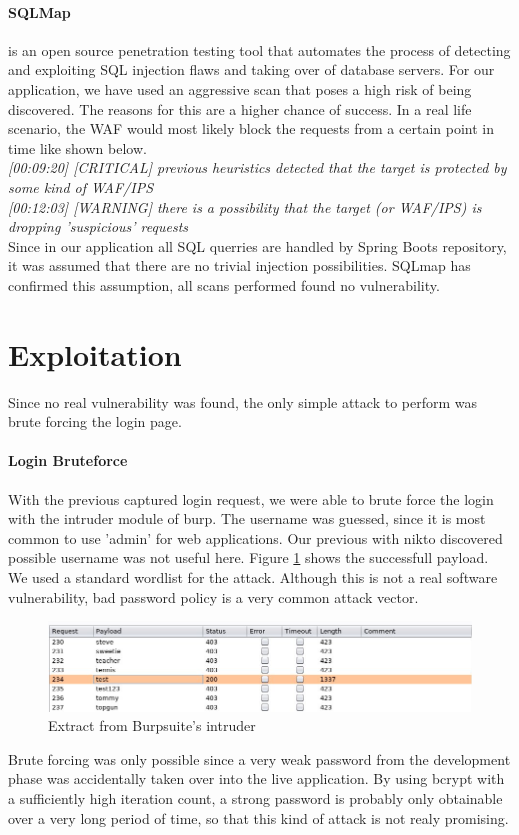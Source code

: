 \documentclass{scrreprt}
\begin{document}
\paragraph{SQLMap} is an open source penetration testing tool that automates the process of detecting and exploiting SQL injection flaws and taking over of database servers. For our application, we have used an aggressive scan that poses a high risk of being discovered. The reasons for this are a higher chance of success. In a real life scenario, the WAF would most likely block the requests from a certain point in time like shown below. \\
\textit{[00:09:20] [CRITICAL] previous heuristics detected that the target is protected by some kind of WAF/IPS} \\
\textit{[00:12:03] [WARNING] there is a possibility that the target (or WAF/IPS) is dropping 'suspicious' requests} \\
Since in our application all SQL querries are handled by Spring Boots repository, it was assumed that there are no trivial injection possibilities. SQLmap has confirmed this assumption, all scans performed found no vulnerability.


\section{Exploitation}
Since no real vulnerability was found, the only simple attack to perform was brute forcing the login page.

\paragraph{Login Bruteforce}
With the previous captured login request, we were able to brute force the login with the intruder module of burp. The username was guessed, since it is most common to use 'admin' for web applications. Our previous with nikto discovered possible username was not useful here. Figure \ref{brute} shows the successfull payload. We used a standard wordlist for the attack. Although this is not a real software vulnerability, bad password policy is a very common attack vector.
\begin{figure}[!h]
	\centering
	\includegraphics[width=14cm]{report/brute.jpg}
	\caption{Extract from Burpsuite's intruder}
	\label{brute}
\end{figure}
Brute forcing was only possible since a very weak password from the development phase was accidentally taken over into the live application. By using bcrypt with a sufficiently high iteration count, a strong password is probably only obtainable over a very long period of time, so that this kind of attack is not realy promising.
\end{document}
